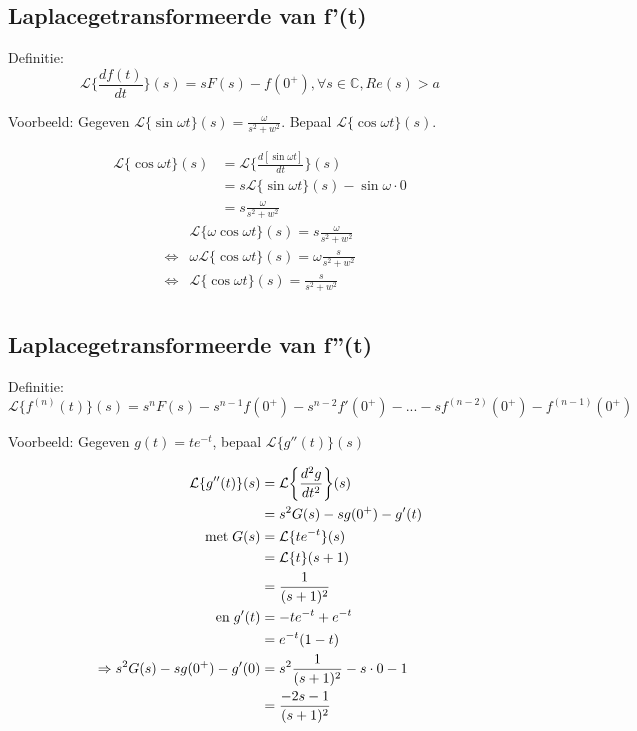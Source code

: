 \documentclass[12pt]{report}
\newcommand{\example}[2]{
    \hrulefill
    
    Voorbeeld: #1
    
    #2
    
    \hrulefill
}
\begin{document}
\subsection{Laplacegetransformeerde van f'(t)}
Definitie:
$$\mathcal{L}\bigg\{\frac{df(t)}{dt}\bigg\}(s) = sF(s) - f(0^+), \forall s \in \mathbb{C}, Re(s) > a$$
\example{Gegeven $\mathcal{L}\{\sin \omega t\}(s) = \frac{\omega}{s^2 + w^2}$. Bepaal $\mathcal{L}\{\cos\omega t\}(s)$. }{
\begin{equation*}
 \begin{split}
  \mathcal{L}\{\cos\omega t\}(s) & = \mathcal{L}\bigg\{\frac{d[\sin \omega t]}{dt}\bigg\}(s) \\
                                 & = s\mathcal{L}\{\sin \omega t\}(s) - \sin{\omega \cdot 0} \\
                                 & = s\frac{\omega}{s^2 + w^2}
 \end{split}
\end{equation*}
\begin{equation*}
 \begin{split}
                  & \mathcal{L}\{\omega \cos\omega t\}(s) = s\frac{\omega}{s^2 + w^2} \\
  \Leftrightarrow & \omega \mathcal{L}\{\cos\omega t\}(s) = \omega\frac{s}{s^2 + w^2} \\
  \Leftrightarrow & \mathcal{L}\{\cos\omega t\}(s) = \frac{s}{s^2 + w^2} \\
 \end{split}
\end{equation*}}
\subsection{Laplacegetransformeerde van f''(t)}
Definitie:
$$\mathcal{L}\{f^{(n)}(t)\}(s) = s^nF(s) - s^{n - 1}f(0^+) - s^{n -2}f'(0^+) - ... - sf^{(n - 2)}(0^+) - f^{(n-1)}(0^+)$$
\example{Gegeven $g(t) = te^{-t}$, bepaal $\mathcal{L}\{g''(t)\}(s)$}{
\begin{equation*}
 \begin{split}
  \mathcal{L}\{g''(t)\}(s) & = \mathcal{L}\bigg\{\frac{d^2g}{dt^2}\bigg\}(s) \\
                           & = s^2G(s) - sg(0^+) - g'(t) \\
                           \hbox{met}\;G(s) & = \mathcal{L}\{te^{-t}\}(s) \\
                                            & = \mathcal{L}\{t\}(s + 1) \\
                                            & = \frac{1}{(s+1)^2}  \\
                           \hbox{en}\; g'(t)  & = -te^{-t} + e^{-t} \\
                                                     & = e^{-t}(1 - t) \\
            \Rightarrow s^2G(s) - sg(0^+) -  g'(0)  & = s^2\frac{1}{(s+1)^2} - s\cdot0 - 1 \\
            & = \frac{-2s - 1}{(s + 1)^2}
 \end{split}
\end{equation*}
}
\end{document}
